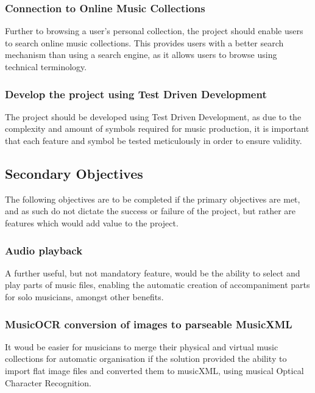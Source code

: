 \subsubsection{Connection to Online Music Collections}
Further to browsing a user's personal collection, the project should enable users to search online music collections. This provides users with a better search mechanism than using a search engine, as it allows users to browse using technical terminology.
\subsubsection{Develop the project using Test Driven Development}
The project should be developed using Test Driven Development, as due to the complexity and amount of symbols required for music production, it is important that each feature and symbol be tested meticulously in order to ensure validity.
\subsection{Secondary Objectives}
The following objectives are to be completed if the primary objectives are met, and as such do not dictate the success or failure of the project, but rather are features which would add value to the project.
\subsubsection{Audio playback}
A further useful, but not mandatory feature, would be the ability to select and play parts of music files, enabling the automatic creation of accompaniment parts for solo musicians, amongst other benefits.
\subsubsection{MusicOCR conversion of images to parseable MusicXML}
It woud be easier for musicians to merge their physical and virtual music collections for automatic organisation if the solution provided the ability to import flat image files and converted them to musicXML, using musical Optical Character Recognition. 